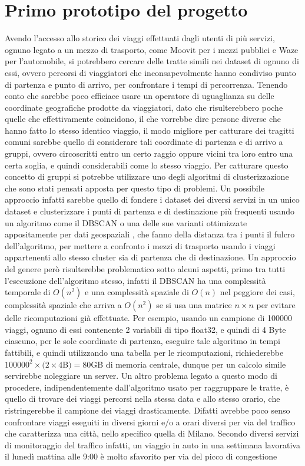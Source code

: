 \section{Primo prototipo del progetto}

Avendo l'accesso allo storico dei viaggi effettuati dagli utenti di più servizi, ognuno legato a un mezzo di trasporto, come Moovit per i mezzi pubblici e Waze per l'automobile, si potrebbero cercare delle tratte simili nei dataset di ognuno di essi, ovvero percorsi di viaggiatori che inconsapevolmente hanno condiviso punto di partenza e punto di arrivo, per confrontare i tempi di percorrenza. Tenendo conto che sarebbe poco efficiace usare un operatore di uguaglianza su delle coordinate geografiche prodotte da viaggiatori, dato che risulterebbero poche quelle che effettivamente coincidono, il che vorrebbe dire persone diverse che hanno fatto lo stesso identico viaggio, il modo migliore per catturare dei tragitti comuni sarebbe quello di considerare tali coordinate di partenza e di arrivo a gruppi, ovvero circoscritti entro un certo raggio oppure vicini tra loro entro una certa soglia, e quindi considerabili come lo stesso viaggio. Per catturare questo concetto di gruppi si potrebbe utilizzare uno degli algoritmi di clusterizzazione che sono stati pensati apposta per questo tipo di problemi. Un possibile approccio infatti sarebbe quello di fondere i dataset dei diversi servizi in un unico dataset e clusterizzare i punti di partenza e di destinazione più frequenti usando un algoritmo come il DBSCAN \cite{ester1996density} o una delle sue varianti ottimizzate appositamente per dati geospaziali \cite{zhou2000combining}\cite{borah2004improved}, che fanno della distanza tra i punti il fulcro dell'algoritmo, per mettere a confronto i mezzi di trasporto usando i viaggi appartenenti allo stesso cluster sia di partenza che di destinazione. Un approccio del genere però risulterebbe problematico sotto alcuni aspetti, primo tra tutti l'esecuzione dell'algoritmo stesso, infatti il DBSCAN ha una complessità temporale di $O(n^{2})$ e una complessità spaziale di $O(n)$ nel peggiore dei casi, complessità spaziale che arriva a $O(n^2)$ se si usa una matrice $n \times n$ per evitare delle ricomputazioni già effettuate. Per esempio, usando un campione di 100000 viaggi, ognuno di essi contenente 2 variabili di tipo float32, e quindi di 4 Byte ciascuno, per le sole coordinate di partenza, eseguire tale algoritmo in tempi fattibili, e quindi utilizzando una tabella per le ricomputazioni, richiederebbe $100000^{2} \times (2 \times 4$B$) = 80 $GB di memoria centrale, dunque per un calcolo simile servirebbe noleggiare un server. Un altro problema legato a questo modo di procedere, indipendentemente dall'algoritmo usato per raggruppare le tratte, è quello di trovare dei viaggi percorsi nella stessa data e allo stesso orario, che ristringerebbe il campione dei viaggi drasticamente. Difatti avrebbe poco senso confrontare viaggi eseguiti in diversi giorni e/o a orari diversi per via del traffico che caratterizza una città, nello specifico quella di Milano. Secondo diversi servizi di monitoraggio del traffico infatti, un viaggio in auto in una settimana lavorativa il lunedì mattina alle 9:00 è molto sfavorito per via del picco di congestione 